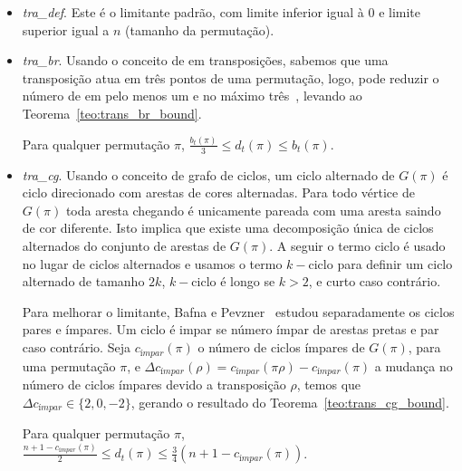 \begin{itemize}
\item{\textit{tra\_def}. 
Este é o limitante padrão, com limite inferior igual à $0$ e limite
superior igual a $n$ (tamanho da permutação).}
\item{\textit{tra\_br}.
Usando o conceito de \bkp{} em transposições, sabemos que uma
transposição atua em três pontos de uma permutação, logo, pode reduzir
o número de \bkp{} em pelo menos um e no máximo
três~\cite{BafnaPevzner*1998}, levando ao
Teorema~\ref{teo:trans_br_bound}.

\begin{teo}
  \label{teo:trans_br_bound}
  Para qualquer permutação $\pi$, $\frac{b_t(\pi)}{3} \leq d_t(\pi) \leq
  b_t(\pi)$.
\end{teo}
}
\item{\textit{tra\_cg}.
Usando o conceito de grafo de ciclos, um ciclo alternado de $G(\pi)$ é
ciclo direcionado com arestas de cores alternadas. Para todo vértice
de $G(\pi)$ toda aresta chegando é unicamente pareada com uma aresta
saindo de cor diferente. Isto implica que existe uma decomposição
única de ciclos alternados do conjunto de arestas de $G(\pi)$. A
seguir o termo ciclo é usado no lugar de ciclos alternados e usamos o
termo $k-\text{ciclo}$ para definir um ciclo alternado de tamanho $2k$,
$k-\text{ciclo}$ é longo se $k > 2$, e curto caso contrário.

Para melhorar o limitante, Bafna e Pevzner~\cite{BafnaPevzner*1998}
estudou separadamente os ciclos pares e ímpares. Um ciclo é impar se
número ímpar de arestas pretas e par caso contrário. Seja
$c_{ímpar}(\pi)$ o número de ciclos ímpares de $G(\pi)$, para uma
permutação $\pi$, e $\Delta c_{ímpar} (\rho) = c_{ímpar} (\pi \rho) -
c_{ímpar} (\pi)$ a mudança no número de ciclos ímpares devido a
transposição $\rho$, temos que $\Delta c_{ímpar} \in \{2, 0, -2\}$,
gerando o resultado do Teorema~\ref{teo:trans_cg_bound}.

\begin{teo} 
  \label{teo:trans_cg_bound} 
  Para qualquer permutação $\pi$, $\frac{n + 1 - c_{ímpar}(\pi)}{2} \leq
  d_t(\pi) \leq \frac{3}{4} (n + 1 - c_{ímpar}(\pi))$.
\end{teo}
}
\end{itemize}
